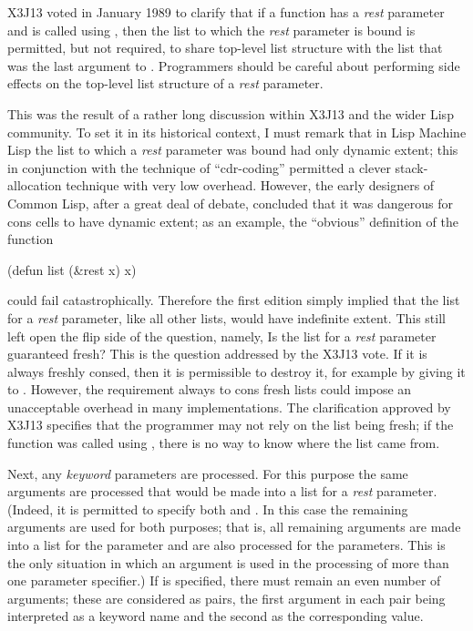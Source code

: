 \begin{new}
X3J13 voted in January 1989
to clarify that if a function has a \textit{rest} parameter
and is called using , then the list to which the
\textit{rest} parameter is bound is permitted, but not required,
to share top-level list structure with the list that was the last
argument to .  Programmers should be careful about performing
side effects on the top-level list structure of a \textit{rest} parameter.

This was the result of a rather long discussion within X3J13 and the
wider Lisp community.  To set it in its historical context, I must remark
that in Lisp Machine Lisp the list to which a \textit{rest} parameter was
bound had only dynamic extent; this in conjunction with the
technique of ``cdr-coding'' permitted a clever stack-allocation technique
with very low overhead.  However, the early designers of
Common Lisp, after a great deal of debate, concluded that it was dangerous
for cons cells to have dynamic extent; as an example, the ``obvious''
definition of the function 
\begin{lisp}
(defun list (\&rest x) x)
\end{lisp}
could fail catastrophically.  Therefore the first edition simply implied
that the list for a \textit{rest} parameter, like all other lists, would
have indefinite extent.  This still left open the flip side of the
question, namely, Is the list for a \textit{rest} parameter guaranteed fresh?
This is the question addressed by the X3J13 vote.
If it is always freshly consed, then it is permissible to destroy it,
for example by giving it to .  However, the requirement always
to cons fresh lists could impose an unacceptable overhead in many implementations.
The clarification approved by X3J13 specifies that the programmer may
not rely on the list being fresh; if the function was called using ,
there is no way to know where the list came from.
\end{new}

Next, any \textit{keyword} parameters are processed.
For this purpose the same arguments are processed that
would be made into a list for a \textit{rest} parameter.
(Indeed, it is permitted to specify both  and .
In this case the remaining arguments are used for both purposes;
that is, all remaining arguments are made into a list for the
 parameter and are also processed for the  parameters.
This is the only situation in which an argument is used
in the processing of more than one parameter specifier.)
If  is specified, there must remain
an even number of arguments; these are considered as pairs,
the first argument in each pair being interpreted as a keyword name
and the second as the corresponding value.

